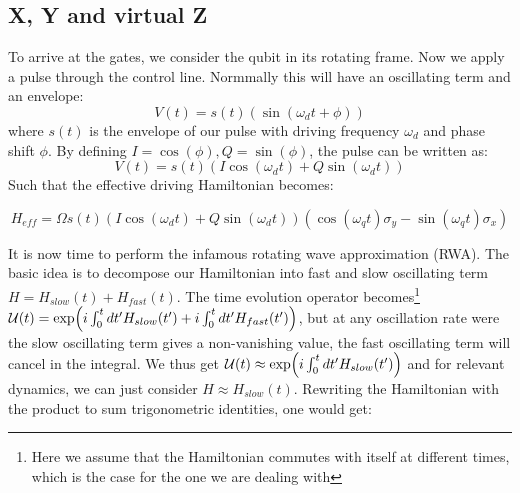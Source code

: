 \subsection{X, Y and virtual Z}\label{sec:how_to_make_gates}
To arrive at the gates, we consider the qubit in its rotating frame. Now we apply a pulse through the control line. Normmally this will have an oscillating term and an envelope:
\begin{equation}
    V(t) = s(t) (\sin(\omega_d t + \phi))
\end{equation}
where $s(t)$ is the envelope of our pulse with driving frequency $\omega_d$ and phase shift $\phi$. By defining $I = \cos(\phi), Q = \sin(\phi)$, the pulse can be written as:
\begin{equation}
    V(t) = s(t) \left(I \cos(\omega_d t) + Q \sin(\omega_d t)\right) 
\end{equation}
Such that the effective driving Hamiltonian becomes:
\begin{fullwidth}
\begin{equation}
    H_{eff} = \Omega s(t) \left(I \cos(\omega_d t) + Q \sin(\omega_d t)\right)   \left(\cos(\omega_q t)\sigma_y - \sin(\omega_q t) \sigma_x \right)
\end{equation}
\end{fullwidth}
It is now time to perform the infamous rotating wave approximation (RWA). The basic idea is to decompose our Hamiltonian into fast and slow oscillating term $H = H_{slow}(t) + H_{fast}(t)$. The time evolution operator becomes\footnote{Here we assume that the Hamiltonian commutes with itself at different times, which is the case for the one we are dealing with} $\mathcal{U}(t) = \exp(i\int_0^tdt'H_{slow}(t') + i\int_0^tdt'H_{fast}(t'))$, but at any oscillation rate were the slow oscillating term gives a non-vanishing value, the fast oscillating term will cancel in the integral. We thus get $\mathcal{U}(t) \approx \exp(i\int_0^tdt'H_{slow}(t'))$ and for relevant dynamics, we can just consider $H\approx H_{slow}(t)$. 
Rewriting the Hamiltonian with the product to sum trigonometric identities, one would get: 

